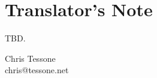 \chapter{Translator's Note}

TBD.

\begin{flushright}
Chris Tessone\\
chris@tessone.net
\end{flushright}
